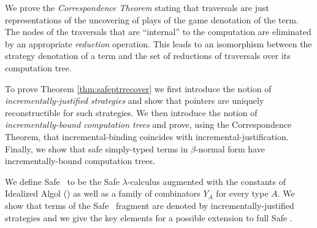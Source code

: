 \documentclass{llncs}
\begin{document}
We prove the \emph{Correspondence Theorem} stating that traversals
are just representations of the uncovering of plays of the game
denotation of the term. The nodes of the traversals that are
``internal'' to the computation are eliminated by an appropriate
\emph{reduction} operation. This leads to an isomorphism between the
strategy denotation of a term and the set of reductions of
traversals over its computation tree.

To prove Theorem \ref{thm:safeptrrecover} we first introduce the
notion of \emph{incrementally-justified strategies} and show that
pointers are uniquely reconstructible for such strategies. We then
introduce the notion of \emph{incrementally-bound computation trees}
and prove, using the Correspondence Theorem, that
incremental-binding coincides with incremental-justification.
Finally, we show that safe simply-typed terms in $\beta$-normal form
have incrementally-bound computation trees.

We define Safe \ialgol\ to be the Safe $\lambda$-calculus augmented
with the constants of Idealized Algol (\ialgol) as well as a family
of combinators $Y_A$ for every type $A$. We show that terms of the
Safe \pcf\ fragment are denoted by incrementally-justified
strategies and we give the key elements for a possible extension to
full Safe \ialgol.
\end{document}
